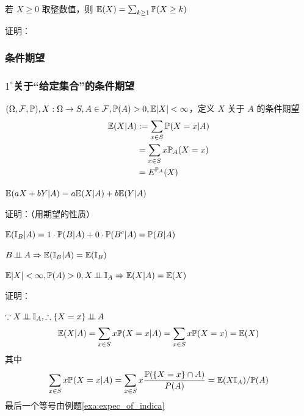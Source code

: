 \begin{theorem}
    若 $X\geq 0$ 取整数值，则 $\mathbb E (X)=\sum_{k\geq 1}\mathbb{P}(X\geq k)$
\end{theorem}

证明：

\subsubsection{条件期望}

\subsubsection*{$1^\circ$关于“给定集合”的条件期望}

\begin{definition}\label{def:set_con_exp}
    $(\Omega, \mathcal{F}, \mathbb{P}), X:\Omega\rightarrow S, A\in \mathcal{F}, \mathbb{P}(A)>0, \mathbb E|X|<\infty$，定义 $X$ 关于 $A$ 的条件期望
    \[
    \begin{aligned}
        \mathbb E(X|A)&:=\sum_{x\in S}\mathbb{P}(X=x|A)\\
        &=\sum_{x\in S}x\mathbb{P}_A(X=x)\\
        &=E^{\mathbb{P}_A}(X)
    \end{aligned}
    \]
\end{definition}

\begin{property}[线性性]\label{prop:linearity1}
$\mathbb E(aX+bY|A)=a\mathbb E(X|A)+b\mathbb E(Y|A)$
\end{property}

证明：（用期望的性质）

\begin{example}
    $\mathbb E(\mathbb I_B|A)=1\cdot \mathbb{P}(B|A)+0\cdot \mathbb{P}(B^c|A)=\mathbb{P}(B|A)$
\end{example}

\begin{example}
    $B\operatorname{\perp\!\!\!\perp} A\Rightarrow \mathbb E(\mathbb I_B|A)=\mathbb E(\mathbb I_B)$
\end{example}

\begin{property}
$\mathbb E|X|<\infty, \mathbb{P}(A)>0, X\operatorname{\perp\!\!\!\perp} \mathbb I_A\Rightarrow \mathbb E(X|A)=\mathbb E(X)$
\end{property}

证明：

$\because X\operatorname{\perp\!\!\!\perp} \mathbb I_A, \therefore \{X=x\}\operatorname{\perp\!\!\!\perp} A$
\[
\mathbb E(X|A)=\sum_{x\in S}x\mathbb{P}(X=x|A)=\sum_{x\in S}x\mathbb{P}(X=x)=\mathbb E(X)
\]
其中
\[
\sum_{x\in S}x\mathbb{P}(X=x|A)=\sum_{x\in S}x\frac{\mathbb{P}(\{X=x\}\cap A)}{P(A)}=\mathbb E(X\mathbb I_A)/\mathbb{P}(A)
\]
最后一个等号由例题\ref{exa:expec_of_indica}

